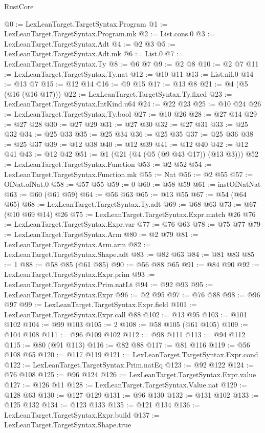 \begin{lexlean}{RustCore}
\begin{coremodule}
@0 := LexLeanTarget.TargetSyntax.Program
@1 := LexLeanTarget.TargetSyntax.Program.mk
@2 := List.cons.{0}
@3 := LexLeanTarget.TargetSyntax.Adt
@4 := @2 @3
@5 := LexLeanTarget.TargetSyntax.Adt.mk
@6 := List.{0}
@7 := LexLeanTarget.TargetSyntax.Ty
@8 := @6 @7
@9 := @2 @8
@10 := @2 @7
@11 := LexLeanTarget.TargetSyntax.Ty.nat
@12 := @10 @11
@13 := List.nil.{0}
@14 := @13 @7
@15 := @12 @14
@16 := @9 @15
@17 := @13 @8
@21 := @4 (@5 (@16 (@16 @17)))
@22 := LexLeanTarget.TargetSyntax.Ty.fixed
@23 := LexLeanTarget.TargetSyntax.IntKind.u64
@24 := @22 @23
@25 := @10 @24
@26 := LexLeanTarget.TargetSyntax.Ty.bool
@27 := @10 @26
@28 := @27 @14
@29 := @27 @28
@30 := @27 @29
@31 := @27 @30
@32 := @27 @31
@33 := @25 @32
@34 := @25 @33
@35 := @25 @34
@36 := @25 @35
@37 := @25 @36
@38 := @25 @37
@39 := @12 @38
@40 := @12 @39
@41 := @12 @40
@42 := @12 @41
@43 := @12 @42
@51 := @1 (@21 (@4 (@5 (@9 @43 @17)) (@13 @3)))
@52 := LexLeanTarget.TargetSyntax.Function
@53 := @2 @52
@54 := LexLeanTarget.TargetSyntax.Function.mk
@55 := Nat
@56 := @2 @55
@57 := OfNat.ofNat.{0}
@58 := @57 @55
@59 := 0
@60 := @58 @59
@61 := instOfNatNat
@63 := @60 (@61 @59)
@64 := @56 @63
@65 := @13 @55
@67 := @54 (@64 @65)
@68 := LexLeanTarget.TargetSyntax.Ty.adt
@69 := @68 @63
@73 := @67 (@10 @69 @14) @26
@75 := LexLeanTarget.TargetSyntax.Expr.match @26
@76 := LexLeanTarget.TargetSyntax.Expr.var
@77 := @76 @63
@78 := @75 @77
@79 := LexLeanTarget.TargetSyntax.Arm
@80 := @2 @79
@81 := LexLeanTarget.TargetSyntax.Arm.arm
@82 := LexLeanTarget.TargetSyntax.Shape.adt
@83 := @82 @63
@84 := @81 @83
@85 := 1
@88 := @58 @85 (@61 @85)
@90 := @56 @88 @65
@91 := @84 @90
@92 := LexLeanTarget.TargetSyntax.Expr.prim
@93 := LexLeanTarget.TargetSyntax.Prim.natLt
@94 := @92 @93
@95 := LexLeanTarget.TargetSyntax.Expr
@96 := @2 @95
@97 := @76 @88
@98 := @96 @97
@99 := LexLeanTarget.TargetSyntax.Expr.field
@101 := LexLeanTarget.TargetSyntax.Expr.call @88
@102 := @13 @95
@103 := @101 @102
@104 := @99 @103
@105 := 2
@108 := @58 @105 (@61 @105)
@109 := @104 @108
@111 := @96 @109 @102
@112 := @98 @111
@113 := @94 @112
@115 := @80 (@91 @113)
@116 := @82 @88
@117 := @81 @116
@119 := @56 @108 @65
@120 := @117 @119
@121 := LexLeanTarget.TargetSyntax.Expr.cond
@122 := LexLeanTarget.TargetSyntax.Prim.natEq
@123 := @92 @122
@124 := @76 @108
@125 := @96 @124
@126 := LexLeanTarget.TargetSyntax.Expr.value
@127 := @126 @11
@128 := LexLeanTarget.TargetSyntax.Value.nat
@129 := @128 @63
@130 := @127 @129
@131 := @96 @130
@132 := @131 @102
@133 := @125 @132
@134 := @123 @133
@135 := @121 @134
@136 := LexLeanTarget.TargetSyntax.Expr.build
@137 := LexLeanTarget.TargetSyntax.Shape.true

\end{coremodule}
\end{lexlean}
